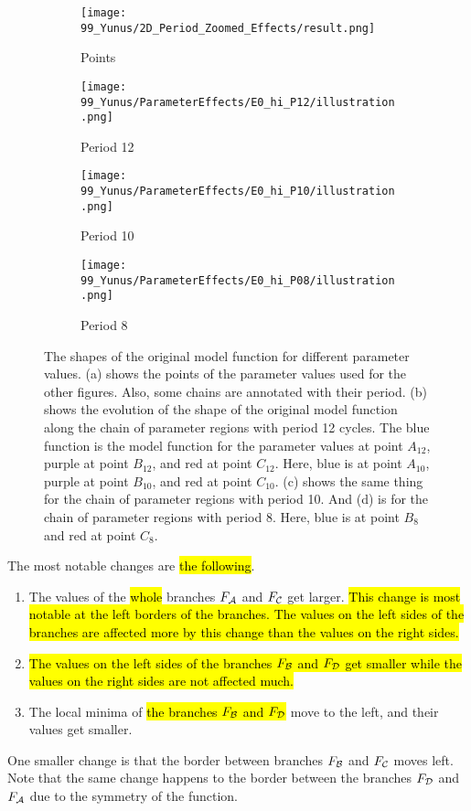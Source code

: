 \begin{figure}
	\centering
	\begin{subfigure}{0.4\textwidth}
		\texttt{[image: 99\_Yunus/2D\_Period\_Zoomed\_Effects/result.png]}
		\caption{Points}
		\label{fig:setup.char.evolution.map}
	\end{subfigure}
	\begin{subfigure}{0.4\textwidth}
		\texttt{[image: 99\_Yunus/ParameterEffects/E0\_hi\_P12/illustration.png]}
		\caption{Period 12}
		\label{fig:setup.char.evolution.12}
	\end{subfigure}
	\begin{subfigure}{0.4\textwidth}
		\texttt{[image: 99\_Yunus/ParameterEffects/E0\_hi\_P10/illustration.png]}
		\caption{Period 10}
		\label{fig:setup.char.evolution.10}
	\end{subfigure}
	\begin{subfigure}{0.4\textwidth}
		\texttt{[image: 99\_Yunus/ParameterEffects/E0\_hi\_P08/illustration.png]}
		\caption{Period 8}
		\label{fig:setup.char.evolution.08}
	\end{subfigure}
	\caption[Effects of parameters on the original model function]{
		The shapes of the original model function for different parameter values.
		(a) shows the points of the parameter values used for the other figures.
		Also, some chains are annotated with their period.
		(b) shows the evolution of the shape of the original model function along the chain of parameter regions with period 12 cycles.
		The blue function is the model function for the parameter values at point $A_{12}$, purple at point $B_{12}$, and red at point $C_{12}$.
		Here, blue is at point $A_{10}$, purple at point $B_{10}$, and red at point $C_{10}$.
		(c) shows the same thing for the chain of parameter regions with period 10.
		And (d) is for the chain of parameter regions with period 8.
		Here, blue is at point $B_8$ and red at point $C_8$.
	}
	\label{fig:setup.char.evolution.combined}
\end{figure}

The most notable changes are \hl{the following}.
\begin{enumerate}
	\item The values of the \hl{whole} branches $F_{\mathcal{A}}$ and $F_{\mathcal{C}}$ get larger.
	      \hl{
		      This change is most notable at the left borders of the branches.
		      The values on the left sides of the branches are affected more by this change than the values on the right sides.
	      }
	\item \hl{
		      The values on the left sides of the branches $F_{\mathcal{B}}$ and $F_{\mathcal{D}}$ get smaller while the values on the right sides are not affected much.
	      }
	\item The local minima of \hl{the branches $F_{\mathcal{B}}$ and $F_{\mathcal{D}}$} move to the left, and their values get smaller.
\end{enumerate}
One smaller change is that the border between branches $F_{\mathcal{B}}$ and $F_{\mathcal{C}}$ moves left.
Note that the same change happens to the border between the branches $F_{\mathcal{D}}$ and $F_{\mathcal{A}}$ due to the symmetry of the function.

